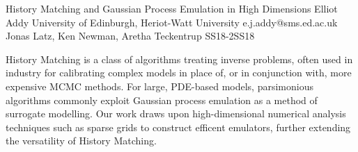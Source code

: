 \begin{talk}
  {History Matching and Gaussian Process Emulation in High Dimensions}%
  {Elliot Addy}%
  {University of Edinburgh, Heriot-Watt University}%
  {e.j.addy@sms.ed.ac.uk}%
  {Jonas Latz, Ken Newman, Aretha Teckentrup}%
{}{}{SS18-2}{SS18}

			
History Matching is a class of algorithms treating inverse problems, often used in industry for calibrating complex models in place of, or in conjunction with, more expensive MCMC methods. For large, PDE-based models, parsimonious algorithms commonly exploit Gaussian process emulation as a method of surrogate modelling. Our work draws upon high-dimensional numerical analysis techniques such as sparse grids to construct efficent emulators, further extending the versatility of History Matching.


\end{talk}

